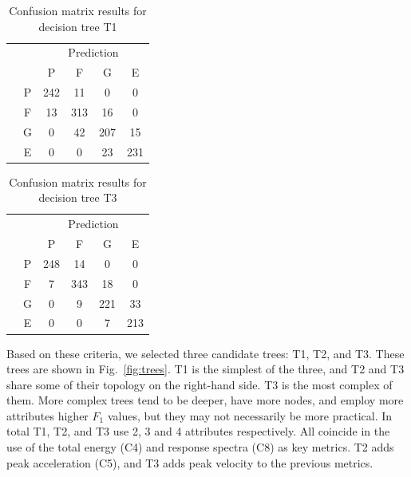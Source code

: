 \begin{table}[t]
	\centering
	\caption{Confusion matrix results for decision tree T1}
	\label{tab:t1:confusion}
	\small
	\begin{tabular}{cccccc}
		& 		& \multicolumn{4}{c}{Prediction}\\ 
		\cline{3-6}
		&   	& P  	& F     & G  	& E 	\\
		\cline{2-6}
		\parbox[t]{2mm}{}  
		& P 	& 242 	& 11 	& 0     & 0    	\\
		& F 	& 13 	& 313   & 16    & 0    	\\
		& G 	& 0 	& 42    & 207   & 15   	\\
		& E 	& 0 	& 0     & 23    & 231	\\ 
	\end{tabular}
\end{table}

\begin{table}[t]
	\centering
	\caption{Confusion matrix results for decision tree T3}
	\label{tab:t3:confusion}
	\small
	\begin{tabular}{cccccc}
		& 		& \multicolumn{4}{c}{Prediction}\\ 
		\cline{3-6}
		&   	& P  	& F     & G  	& E 	\\
		\cline{2-6}
		\parbox[t]{2mm}{\multirow{4}{*}{\rotatebox[origin=c]{90}{Actual}}}  
		& P 	& 248 	& 14 	& 0     & 0    	\\
		& F 	& 7 	& 343   & 18    & 0    	\\
		& G 	& 0 	& 9 	& 221   & 33   	\\
		& E 	& 0 	& 0     & 7    	& 213	\\ 
	\end{tabular}
\end{table}

Based on these criteria, we selected three candidate trees: T1, T2, and T3. These trees are shown in Fig.~\ref{fig:trees}. T1 is the simplest of the three, and T2 and T3 share some of their topology on the right-hand side. T3 is the most complex of them. More complex trees tend to be deeper, have more nodes, and employ more attributes higher $F_1$ values, but they may not necessarily be more practical. In total T1, T2, and T3 use 2, 3 and 4 attributes respectively. All coincide in the use of the total energy (C4) and response spectra (C8) as key metrics. T2 adds peak acceleration (C5), and T3 adds peak velocity  to the previous metrics.


